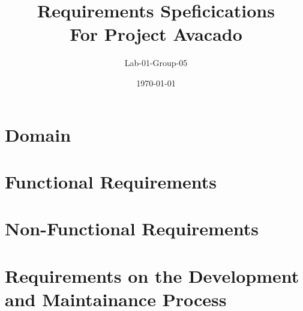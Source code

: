 \documentclass{article}
\title{Requirements Speficications \\ \large{For Project Avacado}}
\author{Lab-01-Group-05}
\date{\today}
\begin{document}
	\maketitle
	\newpage
	
	\section{Domain}
	
	\section{Functional Requirements}
	
	\section{Non-Functional Requirements}
	
	\section{Requirements on the Development and Maintainance Process}
\end{document}
